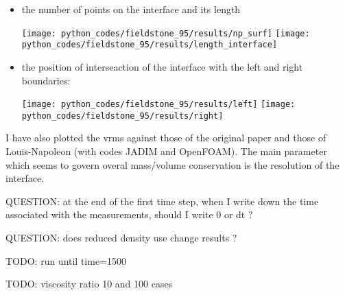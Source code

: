 \begin{itemize}
\item the number of points on the interface
and its length 

\begin{center}
\texttt{[image: python\_codes/fieldstone\_95/results/np\_surf]}
\texttt{[image: python\_codes/fieldstone\_95/results/length\_interface]}
\end{center}

\item the position of interseaction of the interface with the left and right boundaries: 

\begin{center}
\texttt{[image: python\_codes/fieldstone\_95/results/left]}
\texttt{[image: python\_codes/fieldstone\_95/results/right]}
\end{center}

\end{itemize}






I have also plotted the vrms against those of the original paper and those of Louis-Napoleon \etal \cite{logb20}
(with codes JADIM and OpenFOAM). 
The main parameter which seems to govern overal mass/volume conservation is the resolution of the interface. 

QUESTION: at the end of the first time step, when I write down the time associated with the measurements, should I write 0
or dt ?

QUESTION: does reduced density use change results ?

TODO: run until time=1500

TODO: viscosity ratio 10 and 100 cases

